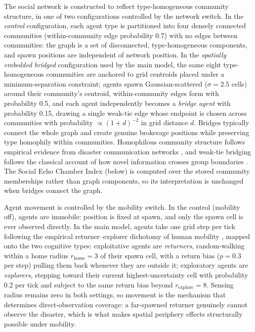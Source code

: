 \documentclass[pdflatex,sn-basic]{sn-jnl}
\begin{document}
The social network is constructed to reflect type-homogeneous community structure, in one of two configurations controlled by the network switch. In the \emph{control} configuration, each agent type is partitioned into four densely connected communities (within-community edge probability 0.7) with no edges between communities: the graph is a set of disconnected, type-homogeneous components, and spawn positions are independent of network position. In the \emph{spatially embedded bridged} configuration used by the main model, the same eight type-homogeneous communities are anchored to grid centroids placed under a minimum-separation constraint; agents spawn Gaussian-scattered ($\sigma = 2.5$ cells) around their community's centroid, within-community edges form with probability 0.5, and each agent independently becomes a \emph{bridge agent} with probability 0.15, drawing a single weak-tie edge whose endpoint is chosen across communities with probability $\propto (1 + d)^{-2}$ in grid distance $d$. Bridges typically connect the whole graph and create genuine brokerage positions while preserving type homophily within communities. Homophilous community structure follows empirical evidence from disaster communication networks \citep{bruns2012qldfloods,sutton2008backchannels},
and weak-tie bridging follows the classical account of how novel information crosses group boundaries \citep{granovetter1973strength}. The Social Echo Chamber Index (below) is computed over the stored community memberships rather than graph components, so its interpretation is unchanged when bridges connect the graph.

Agent movement is controlled by the mobility switch. In the control (mobility off), agents are immobile: position is fixed at spawn, and only the spawn cell is ever observed directly. In the main model, agents take one grid step per tick following the empirical returner--explorer dichotomy of human mobility \citep{pappalardo2015returners}, mapped onto the two cognitive types: exploitative agents are \emph{returners}, random-walking within a home radius $r_{\text{home}} = 3$ of their spawn cell, with a return bias ($p = 0.3$ per step) pulling them back whenever they are outside it; exploratory agents are \emph{explorers}, stepping toward their current highest-uncertainty cell with probability 0.2 per tick and subject to the same return bias beyond $r_{\text{explore}} = 8$. Sensing radius remains zero in both settings, so movement is the mechanism that determines direct-observation coverage: a far-spawned returner genuinely cannot observe the disaster, which is what makes spatial periphery effects structurally possible under mobility.
\end{document}
